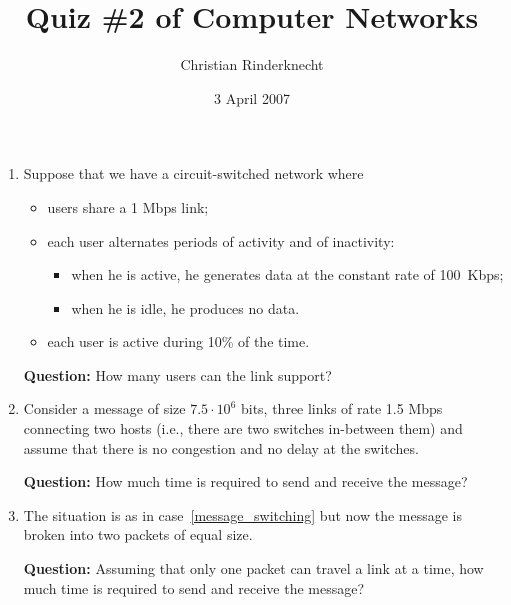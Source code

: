 \documentclass[11pt,a4paper]{article}
\title{Quiz \#2 of Computer Networks}
\author{Christian Rinderknecht}
\date{3 April 2007}
\begin{document}
\maketitle

\thispagestyle{empty}

\begin{enumerate}

  \item Suppose that we have a circuit-switched network where
    \begin{itemize}

      \item users share a 1 Mbps link;

      \item each user alternates periods of activity and of inactivity:
        \begin{itemize}

          \item when he is active, he generates data at the constant
            rate of 100~Kbps;

          \item when he is idle, he produces no data.

        \end{itemize}

      \item each user is active during 10\% of the time.

    \end{itemize}
    \textbf{Question:} How many users can the link support?

  \item \label{message_switching} Consider a message of size \(7.5
    \cdot 10^6\) bits, three links of rate 1.5 Mbps connecting two
    hosts (i.e., there are two switches in-between them) and assume
    that there is no congestion and no delay at the switches.

    \textbf{Question:} How much time is required to send and receive
    the message?

  \item The situation is as in case~\ref{message_switching} but now
    the message is broken into two packets of equal size.

    \textbf{Question:} Assuming that only one packet can travel a link
    at a time, how much time is required to send and receive the
    message?


\end{enumerate}
\end{document}
